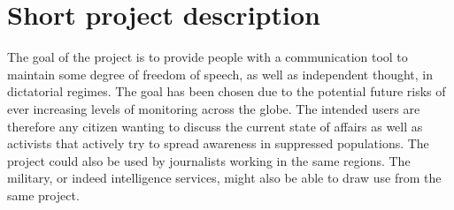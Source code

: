\section{Short project description}
The goal of the project is to provide people with a communication tool to maintain some degree of freedom of speech, as well as independent thought, in dictatorial regimes. 
The goal has been chosen due to the potential future risks of ever increasing levels of monitoring across the globe. The intended users are therefore any citizen wanting to discuss the current state of affairs as well as activists that actively try to spread awareness in suppressed populations. The project could also be used by journalists working in the same regions. The military, or indeed intelligence services, might also be able to draw use from the same project.